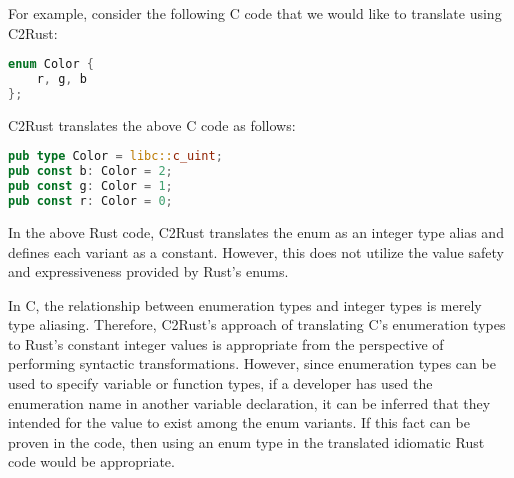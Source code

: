 \documentclass[10pt,conference]{IEEEtran}
\begin{document}
For example, consider the following C code that we would like to translate using C2Rust:

\begin{lstlisting}[language=C]
enum Color {
    r, g, b
};
\end{lstlisting}

C2Rust translates the above C code as follows:

\begin{lstlisting}[language=Rust]
pub type Color = libc::c_uint;
pub const b: Color = 2;
pub const g: Color = 1;
pub const r: Color = 0;
\end{lstlisting}


In the above Rust code, C2Rust translates the enum as an integer type alias and defines each variant as a constant. However, this does not utilize the value safety and expressiveness provided by Rust's enums.


In C, the relationship between enumeration types and integer types is merely type aliasing. Therefore, C2Rust's approach of translating C's enumeration types to Rust's constant integer values is appropriate from the perspective of performing syntactic transformations. However, since enumeration types can be used to specify variable or function types, if a developer has used the enumeration name in another variable declaration, it can be inferred that they intended for the value to exist among the enum variants. If this fact can be proven in the code, then using an enum type in the translated idiomatic Rust code would be appropriate.

\end{document}
